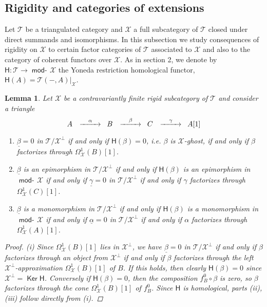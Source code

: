 \documentclass[oneside, a4paper,reqno]{amsart}
\numberwithin{equation}{section}
\newtheorem{lem}[thm]{Lemma}
\theoremstyle{definition}
\begin{document}
\subsection{Rigidity and categories of extensions} Let ${\mathcal T}$ be a triangulated category and ${\mathcal X}$ a full subcategory of ${\mathcal T}$ closed under direct summands and isomorphisms. In this subsection we study consequences of rigidity on ${\mathcal X}$ to certain factor categories of ${\mathcal T}$ associated to ${\mathcal X}$ and also to the category of coherent functors over ${\mathcal X}$. 
As in section 2, we denote by $\mathsf{H} \colon {\mathcal T} {\longrightarrow} \operatorname*{\mathsf{mod}-\!}{\mathcal X}$ the Yoneda restriction homological functor, $\mathsf{H}(A) = {\mathcal T}(-,A)|_{\mathcal X}$. 

\begin{lem} Let ${\mathcal X}$ be a contravariantly finite rigid subcategory of ${\mathcal T}$ and consider a triangle 
\[
\begin{CD}
A \,\ @> \alpha >> \,\, B \,\ @> \beta >> \,\, C \,\ @> \gamma >> \,\, A[1]
\end{CD}
\] 
\begin{enumerate}
\item $\underline{\beta} = 0$ in ${\mathcal T}/{\mathcal X}^{\bot}$ if and only if $\mathsf{H}(\beta) = 0$, i.e. $\beta$ is ${\mathcal X}$-ghost, if and only if $\beta$ factorizes through $\Omega^{1}_{\mathcal X}(B)[1]$.  
\item $\underline{\beta}$ is an epimorphism in ${\mathcal T}/{\mathcal X}^{\bot}$ if and only if $\mathsf{H}(\beta)$ is an epimorphism in $\operatorname*{\mathsf{mod}-\!}{\mathcal X}$ if and only if $\underline{\gamma} = 0$ in ${\mathcal T}/{\mathcal X}^{\bot}$ if and only if $\gamma$ factorizes through $\Omega^{1}_{\mathcal X}(C)[1]$.
\item $\underline{\beta}$ is a monomorphism in ${\mathcal T}/{\mathcal X}^{\bot}$ if and only if $\mathsf{H}(\beta)$ is a monomorphism in $\operatorname*{\mathsf{mod}-\!}{\mathcal X}$ if and only if $\underline{\alpha} = 0$ in ${\mathcal T}/{\mathcal X}^{\bot}$ if and only if $\alpha$ factorizes through $\Omega^{1}_{\mathcal X}(A)[1]$.
\end{enumerate}
\begin{proof} (i) Since $\Omega^{1}_{\mathcal X}(B)[1]$ lies in ${\mathcal X}^{\bot}$, we have $\underline{\beta} = 0$ in ${\mathcal T}/{\mathcal X}^{\bot}$ if and only if $\beta$ factorizes through an object from ${\mathcal X}^{\bot}$ if and only if $\beta$ factorizes through the left ${\mathcal X}^{\bot}$-approximation $\Omega^{1}_{\mathcal X}(B)[1]$ of $B$. If this holds, then clearly $\mathsf{H}(\beta) = 0$ since ${\mathcal X}^{\bot} = \operatorname*{\mathsf{Ker}}\mathsf{H}$.  Conversely if $\mathsf{H}(\beta) = 0$, then the composition $f^{0}_{B} \circ \beta$ is zero, so $\beta$ factorizes through the cone $\Omega^{1}_{\mathcal X}(B)[1]$ of $f^{0}_{B}$. Since $\mathsf{H}$ is homological, parts (ii), (iii) follow directly from (i).
\end{proof} 
\end{lem} 
\end{document}
